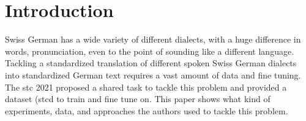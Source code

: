 \section{Introduction}
Swiss German has a wide variety of different dialects, with a huge difference in words, pronunciation, even to the point of sounding like a different language. Tackling a standardized translation of
different spoken Swiss German dialects into standardized German text requires a vast amount of data and fine tuning. The \gls{stc} 2021 proposed a shared task to tackle this problem and provided a dataset
(\gls{stcd} to train and fine tune on. This paper shows what kind of experiments, data, and approaches the authors used to tackle this problem.     

